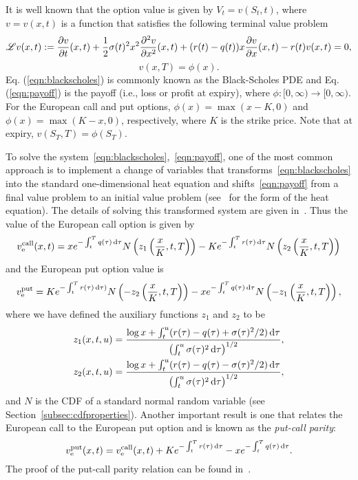 It is well known that the option value is given by $V_t = v(S_t,t)$, where $v = v(x,t)$ is a function that satisfies the following terminal value problem
	\begin{equation}
		\label{eqn:blackscholes}
		\mathscr L v(x,t) := \frac{\partial v}{\partial t}(x,t) + \frac{1}{2}\sigma(t)^2x^2\frac{\partial^2 v}{\partial x^2}(x,t) + (r(t)-q(t))x\frac{\partial v}{\partial x}(x,t) - r(t)v(x,t) = 0,
	\end{equation}
	\begin{equation}
		\label{eqn:payoff}
		v(x,T) = \phi(x).
	\end{equation}
Eq. (\ref{eqn:blackscholes}) is commonly known as the Black-Scholes PDE and Eq. (\ref{eqn:payoff}) is the payoff (i.e., loss or profit at expiry), where $\phi : [0,\infty) \rightarrow [0, \infty)$. For the European call and put options, $\phi(x) = \max(x-K,0)$ and $\phi(x) = \max(K-x,0)$, respectively, where $K$ is the strike price. Note that at expiry, $v(S_T,T) = \phi(S_T)$.

To solve the system~\eqref{eqn:blackscholes},~\eqref{eqn:payoff}, one of the most common approach is to implement a change of variables that transforms~\eqref{eqn:blackscholes} into the standard one-dimensional heat equation and shifts~\eqref{eqn:payoff} from a final value problem to an initial value problem (see~\cite{cannon1984one} for the form of the heat equation).
The details of solving this transformed system are given in~\cite{Wilmott1995}. Thus the value of the European call option is given by
	\begin{equation}
		\label{eqn:EUcall}
			v_{\text{e}}^{\text{call}}(x,t) = xe^{-\int_t^T q(\tau) \, \mathrm d\tau} N\left(z_1\left( \frac{x}{K}, t, T \right)\right) - K e^{-\int_t^T r(\tau) \, \mathrm d\tau} N\left(z_2\left( \frac{x}{K}, t, T \right)\right)
		\end{equation}
and the European put option value is
	\begin{equation}
		\label{eqn:EUput}
		v_{\text{e}}^{\text{put}} = K e^{-\int_t^T r(\tau) \, \mathrm d\tau) } N\left(-z_2\left( \frac{x}{K}, t, T \right)\right) - xe^{-\int_t^T q(\tau) \, \mathrm d\tau} N\left(-z_1\left( \frac{x}{K}, t, T \right)\right),
	\end{equation}
where we have defined the auxiliary functions $z_1$ and $z_2$ to be
	\begin{align}
		z_1(x,t,u) & = \frac{\log x + \int_t^u (r(\tau) - q(\tau) + \sigma(\tau)^2/2) \, \mathrm d\tau}{\left(\int_t^u \sigma(\tau)^2 \, \mathrm d\tau\right)^{1/2}}, \label{eqn:z1}\\
		z_2(x,t,u) & = \frac{\log x + \int_t^u (r(\tau) - q(\tau) - \sigma(\tau)^2/2) \, \mathrm d\tau}{\left(\int_t^u \sigma(\tau)^2 \, \mathrm d\tau\right)^{1/2}} \label{eqn:z2},
	\end{align}
and $N$ is the CDF of a standard normal random variable (see Section~\ref{subsec:cdfproperties}). Another important result is one that relates the European call to the European put option and is known as the \emph{put-call parity}:
	\begin{equation}
		\label{eqn:pcp}
		v_\text{e}^{\text{put}}(x,t) = v_\text{e}^{\text{call}}(x,t) + Ke^{-\int_t^T r(\tau) \, \mathrm d\tau} - xe^{-\int_t^T q(\tau) \, \mathrm d\tau}.
	\end{equation}
The proof of the put-call parity relation can be found in~\cite{Kwok2008}.

